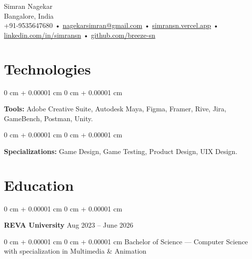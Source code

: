 \documentclass[10pt, letterpaper]{article}
\newenvironment{onecolentry}{
    \begin{adjustwidth}{
        0 cm + 0.00001 cm
    }{
        0 cm + 0.00001 cm
    }
}{
    \end{adjustwidth}
} %
\newenvironment{twocolentry}[2][]{
    \onecolentry
    \def\secondColumn{#2}
    \setcolumnwidth{\fill, 4.5 cm}
    \begin{paracol}{2}
}{
    \switchcolumn \raggedleft \secondColumn
    \end{paracol}
    \endonecolentry
} %
\newenvironment{header}{
    \setlength{\topsep}{0pt}\par\kern\topsep\raggedright\linespread{1.5}
}{
    \par\kern\topsep
} %
\begin{document}
    \newcommand{\AND}{\unskip
        \cleaders\copy\ANDbox\hskip\wd\ANDbox
        \ignorespaces
    }
    \newsavebox\ANDbox
    \sbox\ANDbox{$|$}

    \begin{header}
    {\color{secondaryColor} \fontsize{25pt}{25pt}\selectfont Simran Nagekar}\\
    \vspace{1pt}
    Bangalore, India\\
    \vspace{2pt}
     \color{secondaryColor}  +91-9535647680 • \href{mailto:nagekarsimran@gmail.com}{\color{secondaryColor}nagekarsimran@gmail.com} • \href{https://simransn.vercel.app/}{\color{secondaryColor}simransn.vercel.app} •
    \href{https://linkedin.com/in/simransn}{\color{secondaryColor}linkedin.com/in/simransn} •
    \href{https://github.com/breeze-sn}{\color{secondaryColor}github.com/breeze-sn}  
\end{header}

    \vspace{5 pt - 0.3 cm}

     
    \section{\color{secondaryColor}Technologies}


        \vspace{0.1 cm}

        \begin{onecolentry}
            \textbf{Tools:} Adobe Creative Suite, Autodesk Maya, Figma, Framer, Rive, Jira, GameBench, Postman, Unity.
        \end{onecolentry}

        \vspace{0.1 cm}

        \begin{onecolentry}
            \textbf{Specializations:} Game Design, Game Testing, Product Design, UIX Design.
        \end{onecolentry}


    \section{\color{secondaryColor}Education} 
        \begin{twocolentry}{
            Aug 2023 – June 2026
        }
            \textbf{REVA University}\end{twocolentry}
            \begin{onecolentry} Bachelor of Science — Computer Science with specialization in Multimedia \& Animation \end{onecolentry}
\end{document}
